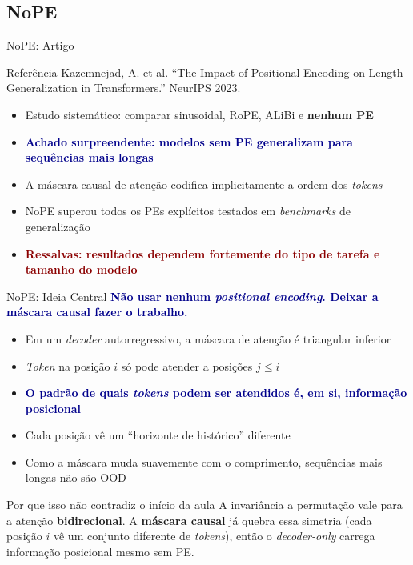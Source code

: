 \documentclass[aspectratio=169, xcolor=dvipsnames]{beamer}
\begin{document}
  \subsection{NoPE}

  \begin{frame}{NoPE: Artigo}
    \begin{block}{Referência}
      Kazemnejad, A. et al. ``The Impact of Positional Encoding on Length Generalization in Transformers.'' NeurIPS 2023.
    \end{block}
    \begin{itemize}
      \item Estudo sistemático: comparar sinusoidal, RoPE, ALiBi e \textbf{nenhum PE}
      \item \textcolor{DarkBlue}{\textbf{Achado surpreendente: modelos sem PE generalizam para sequências mais longas}}
      \item A máscara causal de atenção codifica implicitamente a ordem dos \textit{tokens}
      \item NoPE superou todos os PEs explícitos testados em \textit{benchmarks} de generalização
      \item \textcolor{DarkRed}{\textbf{Ressalvas: resultados dependem fortemente do tipo de tarefa e tamanho do modelo}}
    \end{itemize}
  \end{frame}

  \begin{frame}{NoPE: Ideia Central}
    \textcolor{DarkBlue}{\textbf{Não usar nenhum \textit{positional encoding}. Deixar a máscara causal fazer o trabalho.}}

    \begin{itemize}
      \item Em um \textit{decoder} autorregressivo, a máscara de atenção é triangular inferior
      \item \textit{Token} na posição $i$ só pode atender a posições $j \le i$
      \item \textcolor{DarkBlue}{\textbf{O padrão de quais \textit{tokens} podem ser atendidos é, em si, informação posicional}}
      \item Cada posição vê um ``horizonte de histórico'' diferente
      \item Como a máscara muda suavemente com o comprimento, sequências mais longas não são OOD
    \end{itemize}

    \begin{block}{Por que isso não contradiz o início da aula}
      A invariância a permutação vale para a atenção \textbf{bidirecional}. A \textbf{máscara causal} já quebra essa simetria (cada posição $i$ vê um conjunto diferente de \textit{tokens}), então o \textit{decoder-only} carrega informação posicional mesmo sem PE. 
    \end{block}
  \end{frame}
\end{document}
